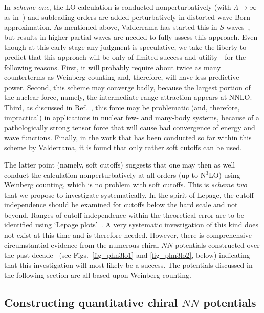 \documentclass[sort&compress,preprint,3p]{elsarticle}
\begin{document}
In {\it scheme one}, the LO calculation is conducted nonperturbatively
(with $\Lambda \rightarrow \infty$ as in~\cite{NTK05})
and subleading orders are added perturbatively in distorted wave Born approximation.
As mentioned above,
Valderrama has started this in $S$ waves~\cite{Val09}, but results in higher
partial waves are needed to fully assess this approach.
Even though at this early stage any judgment is speculative, we take the liberty to predict
that this approach will be only of limited success and utility---for the following reasons.
First, it will probably require about twice as many counterterms as Weinberg counting
and, therefore, will have less predictive power. Second, this scheme may converge badly,
because the largest portion of the nuclear force, namely, the intermediate-range
attraction appears at NNLO. Third, as discussed in Ref.~\cite{Mac09}, this force may be problematic
(and, therefore, impractical) in applications in nuclear few- and many-body systems, 
because of a pathologically strong tensor force that will cause bad convergence of energy and wave functions. Finally, in the work that has been conducted so far within this
scheme by Valderrama,
it is found that only rather soft cutoffs can be used.

The latter point (namely, soft cutoffs) suggests that one may then as well
conduct the calculation nonperturbatively at all orders (up to N$^3$LO) using Weinberg counting, 
which is no problem with soft cutoffs. This is {\it scheme two} that we propose to
investigate systematically. 
In the spirit of Lepage, the cutoff independence should be examined
for cutoffs below the hard scale and not beyond. Ranges of cutoff independence within the
theoretical error are to be identified using `Lepage plots'~\cite{Lep97}.
A very systematic investigation of this kind does not exist at this time and is therefore needed.
However, there is comprehensive circumstantial
evidence from the numerous chiral $NN$ potentials constructed over the past 
decade~\cite{ORK94,EGM00,EM02a,EM02,EM03,ME05,EGM05}
(see Figs.~\ref{fig_phn3lo1} and \ref{fig_phn3lo2}, below)
indicating that this investigation will most likely be a success. 
The potentials discussed in the following section are all based upon
Weinberg counting. 


\subsection{Constructing quantitative chiral $NN$ potentials
\label{sec_pot2}}
\end{document}
